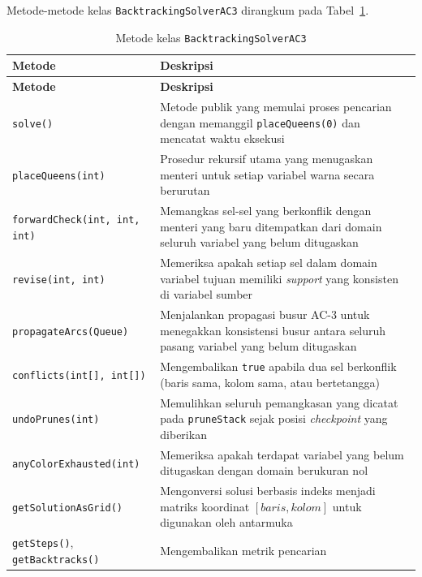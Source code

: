 Metode-metode kelas \texttt{BacktrackingSolverAC3} dirangkum pada Tabel~\ref{tab:method-backtracking}.

\begin{longtable}{lp{8.5cm}}
	\caption{Metode kelas \texttt{BacktrackingSolverAC3}}
	\label{tab:method-backtracking} \\
	\toprule
	\textbf{Metode} & \textbf{Deskripsi} \\
	\midrule
	\endfirsthead
	\toprule
	\textbf{Metode} & \textbf{Deskripsi} \\
	\midrule
	\endhead
	\bottomrule
	\endfoot
	\texttt{solve()} & Metode publik yang memulai proses pencarian dengan memanggil \texttt{placeQueens(0)} dan mencatat waktu eksekusi \\
	\midrule
	\texttt{placeQueens(int)} & Prosedur rekursif utama yang menugaskan menteri untuk setiap variabel warna secara berurutan \\
	\midrule
	\texttt{forwardCheck(int, int, int)} & Memangkas sel-sel yang berkonflik dengan menteri yang baru ditempatkan dari domain seluruh variabel yang belum ditugaskan \\
	\midrule
	\texttt{revise(int, int)} & Memeriksa apakah setiap sel dalam domain variabel tujuan memiliki \textit{support} yang konsisten di variabel sumber \\
	\midrule
	\texttt{propagateArcs(Queue)} & Menjalankan propagasi busur AC-3 untuk menegakkan konsistensi busur antara seluruh pasang variabel yang belum ditugaskan \\
	\midrule
	\texttt{conflicts(int[], int[])} & Mengembalikan \texttt{true} apabila dua sel berkonflik (baris sama, kolom sama, atau bertetangga) \\
	\midrule
	\texttt{undoPrunes(int)} & Memulihkan seluruh pemangkasan yang dicatat pada \texttt{pruneStack} sejak posisi \textit{checkpoint} yang diberikan \\
	\midrule
	\texttt{anyColorExhausted(int)} & Memeriksa apakah terdapat variabel yang belum ditugaskan dengan domain berukuran nol \\
	\midrule
	\texttt{getSolutionAsGrid()} & Mengonversi solusi berbasis indeks menjadi matriks koordinat $[\textit{baris}, \textit{kolom}]$ untuk digunakan oleh antarmuka \\
	\midrule
	\texttt{getSteps()}, \texttt{getBacktracks()} & Mengembalikan metrik pencarian \\
	\bottomrule
\end{longtable}

